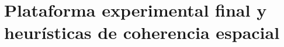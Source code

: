 \documentclass[../MAIN.tex]{subfiles}
\begin{document}
	
	
	\section{Plataforma experimental final y heurísticas de coherencia espacial}
	
	
\end{document}
